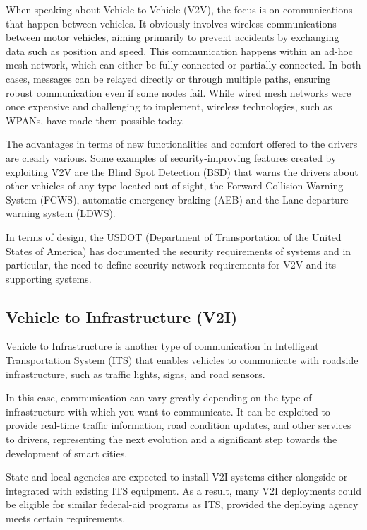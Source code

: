 When speaking about Vehicle-to-Vehicle (V2V), the focus is on communications that happen between vehicles.
It obviously involves wireless communications between motor vehicles,
aiming primarily to prevent accidents by exchanging data such as position and speed.
This communication happens within an ad-hoc mesh network, which can either be fully connected or partially connected.
In both cases, messages can be relayed directly or through multiple paths,
ensuring robust communication even if some nodes fail.
While wired mesh networks were once expensive and challenging to implement,
wireless technologies, such as WPANs, have made them possible today\cite{arena2019overview}.

The advantages in terms of new functionalities and comfort offered to the drivers are clearly various.
Some examples of security-improving features created by exploiting V2V are the Blind Spot Detection (BSD) that warns the drivers about other vehicles of any type located out of sight,
the Forward Collision Warning System (FCWS), automatic emergency braking (AEB) and the Lane departure warning system (LDWS)\cite{arena2019overview}.

In terms of design,
the USDOT (Department of Transportation of the United States of America) has documented the security requirements of
systems and in particular, the need to define security network requirements for V2V and its supporting systems.

\subsection{Vehicle to Infrastructure (V2I)}\label{subsec:vehicle-to-infrastructure-(v2i)}
Vehicle to Infrastructure is another type of communication in Intelligent Transportation System (ITS)
that enables vehicles to communicate with roadside infrastructure, such as traffic lights, signs, and road sensors.

In this case, communication can vary greatly depending on the type of infrastructure with which you want to communicate.
It can be exploited to provide real-time traffic information, road condition updates, and other services to drivers,
representing the next evolution and a significant step towards the development of smart cities\cite{dot2024v2i}.

State and local agencies are expected to install V2I systems either alongside or integrated with existing ITS equipment.
As a result, many V2I deployments could be eligible for similar federal-aid programs as ITS,
provided the deploying agency meets certain requirements\cite{dot2024v2i}.


